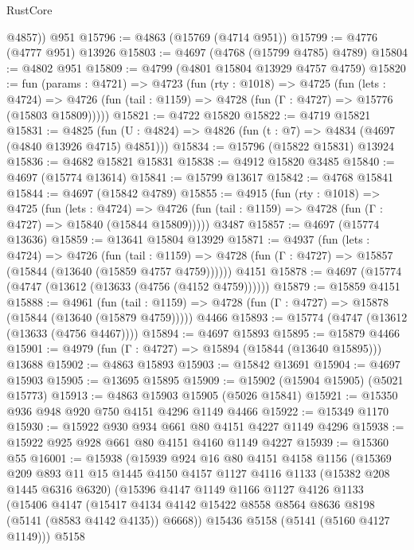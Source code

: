 \begin{lexlean}{RustCore}
\begin{coremodule}
        @4857))
    @951
@15796 := @4863 (@15769 (@4714 @951))
@15799 := @4776 (@4777 @951) @13926
@15803 := @4697 (@4768 (@15799 @4785) @4789)
@15804 := @4802 @951
@15809 := @4799 (@4801 @15804 @13929 @4757 @4759)
@15820 := fun (params : @4721) =>
  @4723
    (fun (rty : @1018) =>
    @4725
      (fun (lets : @4724) =>
      @4726 (fun (tail : @1159) => @4728 (fun (Γ : @4727) => @15776 (@15803 @15809)))))
@15821 := @4722 @15820
@15822 := @4719 @15821
@15831 := @4825
    (fun (U : @4824) => @4826 (fun (t : @7) => @4834 (@4697 (@4840 @13926 @4715) @4851)))
@15834 := @15796 (@15822 @15831) @13924
@15836 := @4682 @15821 @15831
@15838 := @4912 @15820 @3485
@15840 := @4697 (@15774 @13614)
@15841 := @15799 @13617
@15842 := @4768 @15841
@15844 := @4697 (@15842 @4789)
@15855 := @4915
    (fun (rty : @1018) =>
    @4725
      (fun (lets : @4724) =>
      @4726 (fun (tail : @1159) => @4728 (fun (Γ : @4727) => @15840 (@15844 @15809)))))
    @3487
@15857 := @4697 (@15774 @13636)
@15859 := @13641 @15804 @13929
@15871 := @4937
    (fun (lets : @4724) =>
    @4726
      (fun (tail : @1159) =>
      @4728 (fun (Γ : @4727) => @15857 (@15844 (@13640 (@15859 @4757 @4759))))))
    @4151
@15878 := @4697 (@15774 (@4747 (@13612 (@13633 (@4756 (@4152 @4759))))))
@15879 := @15859 @4151
@15888 := @4961
    (fun (tail : @1159) => @4728 (fun (Γ : @4727) => @15878 (@15844 (@13640 (@15879 @4759)))))
    @4466
@15893 := @15774 (@4747 (@13612 (@13633 (@4756 @4467))))
@15894 := @4697 @15893
@15895 := @15879 @4466
@15901 := @4979 (fun (Γ : @4727) => @15894 (@15844 (@13640 @15895))) @13688
@15902 := @4863 @15893
@15903 := @15842 @13691
@15904 := @4697 @15903
@15905 := @13695 @15895
@15909 := @15902 (@15904 @15905) (@5021 @15773)
@15913 := @4863 @15903 @15905 (@5026 @15841)
@15921 := @15350 @936 @948 @920 @750 @4151 @4296 @1149 @4466
@15922 := @15349 @1170
@15930 := @15922 @930 @934 @661 @80 @4151 @4227 @1149 @4296
@15938 := @15922 @925 @928 @661 @80 @4151 @4160 @1149 @4227
@15939 := @15360 @55
@16001 := @15938
    (@15939
      @924
      @16
      @80
      @4151
      @4158
      @1156
      (@15369
        @209
        @893
        @11
        @15
        @1445
        @4150
        @4157
        @1127
        @4116
        @1133
        (@15382 @208 @1445 @6316 @6320)
        (@15396
          @4147
          @1149
          @1166
          @1127
          @4126
          @1133
          (@15406
            @4147
            (@15417 @4134 @4142 @15422 @8558 @8564 @8636 @8198 (@5141 (@8583 @4142 @4135)) @6668))
          @15436
          @5158
          (@5141 (@5160 @4127 @1149)))
        @5158

\end{coremodule}
\end{lexlean}

